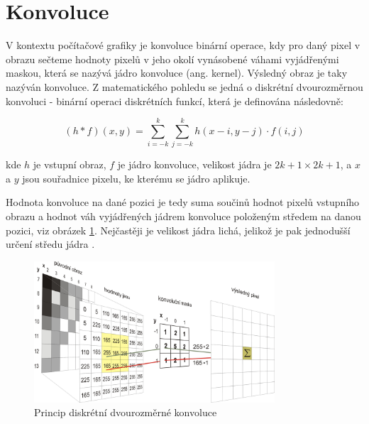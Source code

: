 
\section{Konvoluce}

V kontextu počítačové grafiky je konvoluce binární operace, kdy pro daný pixel
v obrazu sečteme hodnoty pixelů v jeho okolí vynásobené váhami vyjádřenými
maskou, která se nazývá jádro konvoluce (ang. kernel). Výsledný obraz je taky
nazýván konvoluce. Z matematického pohledu se jedná o diskrétní dvourozměrnou
konvoluci - binární operaci diskrétních funkcí, která je definována následovně:

\begin{equation*}
    (h*f)(x,y)=\sum _{i=-k}^{k}\sum _{j=-k}^{k}h(x-i,y-j)\cdot f(i,j)
\end{equation*}

kde $h$ je vstupní obraz, $f$ je jádro konvoluce, velikost jádra je $2k+1
    \times 2k+1$, a $x$ a $y$ jsou souřadnice pixelu, ke kterému se jádro aplikuje.

Hodnota konvoluce na dané pozici je tedy suma součinů hodnot pixelů vstupního
obrazu a hodnot váh vyjádřených jádrem konvoluce položeným středem na danou
pozici, viz obrázek \ref{fig:convolution}. Nejčastěji je velikost jádra lichá,
jelikož je pak jednodušší určení středu jádra \cite{cnn_introduction}.

\begin{figure}[]
    \centering
    \includegraphics[width=0.8\textwidth]{Figures/convolution.jpg}
    \caption{Princip diskrétní dvourozměrné konvoluce \cite{convolution}}
    \label{fig:convolution}
\end{figure}


